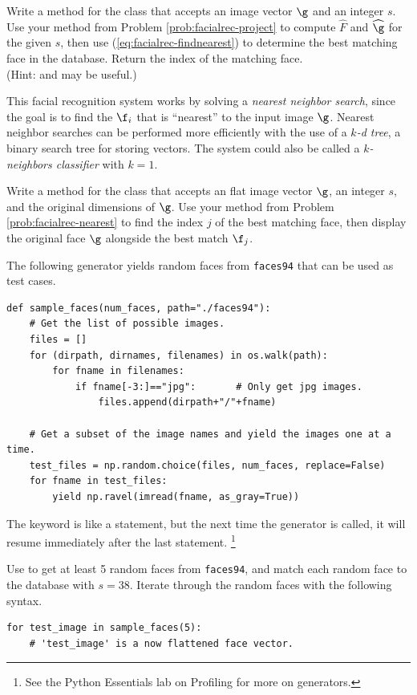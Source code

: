 \begin{problem} %
Write a method for the  class that accepts an image vector $\g$ and an integer $s$.
Use your method from Problem \ref{prob:facialrec-project} to compute $\widehat{F}$ and $\widehat{\g}$ for the given $s$, then use (\ref{eq:facialrec-findnearest}) to determine the best matching face in the database.
Return the index of the matching face.
\\(Hint:  and  may be useful.)
\label{prob:facialrec-nearest}
\end{problem}

\begin{info}
This facial recognition system works by solving a \emph{nearest neighbor search}, since the goal is to find the $\f_i$ that is ``nearest'' to the input image $\g$.
Nearest neighbor searches can be performed more efficiently with the use of a \emph{$k$-d tree}, a binary search tree for storing vectors.
The system could also be called a \emph{$k$-neighbors classifier} with $k=1$.
\end{info}

\begin{problem}
Write a method for the  class that accepts an flat image vector $\g$, an integer $s$, and the original dimensions of $\g$.
Use your method from Problem \ref{prob:facialrec-nearest} to find the index $j$ of the best matching face, then display the original face $\g$ alongside the best match $\f_j$.

The following generator yields random faces from \texttt{faces94} that can be used as test cases.
%
\begin{lstlisting}
def sample_faces(num_faces, path="./faces94"):
    # Get the list of possible images.
    files = []
    for (dirpath, dirnames, filenames) in os.walk(path):
        for fname in filenames:
            if fname[-3:]=="jpg":       # Only get jpg images.
                files.append(dirpath+"/"+fname)

    # Get a subset of the image names and yield the images one at a time.
    test_files = np.random.choice(files, num_faces, replace=False)
    for fname in test_files:
        yield np.ravel(imread(fname, as_gray=True))
\end{lstlisting}
%
The  keyword is like a  statement, but the next time the generator is called, it will resume immediately after the last  statement.%
\footnote{See the Python Essentials lab on Profiling for more on generators.}

Use  to get at least 5 random faces from \texttt{faces94}, and match each random face to the database with $s=38$.
Iterate through the random faces with the following syntax.
%
\begin{lstlisting}
for test_image in sample_faces(5):
    # 'test_image' is a now flattened face vector.
\end{lstlisting}
\label{prob:facialrec-match}
\end{problem}

